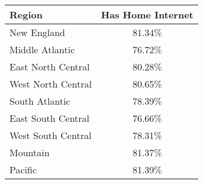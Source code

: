 \documentclass{article}
\begin{document}
\begin{table}[ht]
\centering
\begin{tabular}{lc}
  \hline
  Region & Has Home Internet \\ 
  \hline
  New England & 81.34\% \\ 
  Middle Atlantic & 76.72\% \\ 
  East North Central & 80.28\% \\ 
  West North Central & 80.65\% \\ 
  South Atlantic & 78.39\% \\ 
  East South Central & 76.66\% \\ 
  West South Central & 78.31\% \\ 
  Mountain & 81.37\% \\ 
  Pacific & 81.39\% \\ 
   \hline
\end{tabular}
\end{table}
\end{document}
